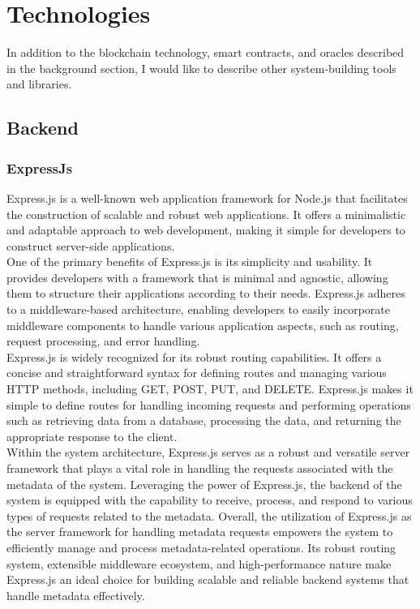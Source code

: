 \documentclass[../Main.tex]{subfiles}
\begin{document}
\section{Technologies}
In addition to the blockchain technology, smart contracts, and oracles described in the background section, I would like to describe other system-building tools and libraries.

\subsection{Backend}
\subsubsection{ExpressJs}
Express.js is a well-known web application framework for Node.js that facilitates the construction of scalable and robust web applications. It offers a minimalistic and adaptable approach to web development, making it simple for developers to construct server-side applications.\\
\indent One of the primary benefits of Express.js is its simplicity and usability. It provides developers with a framework that is minimal and agnostic, allowing them to structure their applications according to their needs. Express.js adheres to a middleware-based architecture, enabling developers to easily incorporate middleware components to handle various application aspects, such as routing, request processing, and error handling.\\
\indent Express.js \cite{expressjs} is widely recognized for its robust routing capabilities. It offers a concise and straightforward syntax for defining routes and managing various HTTP methods, including GET, POST, PUT, and DELETE. Express.js makes it simple to define routes for handling incoming requests and performing operations such as retrieving data from a database, processing the data, and returning the appropriate response to the client.\\
\indent Within the system architecture, Express.js serves as a robust and versatile server framework that plays a vital role in handling the requests associated with the metadata of the system. Leveraging the power of Express.js, the backend of the system is equipped with the capability to receive, process, and respond to various types of requests related to the metadata.
Overall, the utilization of Express.js as the server framework for handling metadata requests empowers the system to efficiently manage and process metadata-related operations. Its robust routing system, extensible middleware ecosystem, and high-performance nature make Express.js an ideal choice for building scalable and reliable backend systems that handle metadata effectively.
\end{document}
